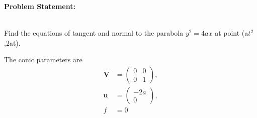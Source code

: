 \documentclass[10pt,a4paper]{report}
\newcommand{\myvec}[1]{\ensuremath{\begin{pmatrix}#1\end{pmatrix}}}
\let\vec\mathbf
\let\vec\mathbf
\begin{document}
\begin{multicols}{2}

\raggedright \textbf{Problem Statement:}\vspace{2mm}
\raggedright \\
\fi
	Find the equations of tangent and normal to the parabola  $y^2 = 4ax$ at point (a$t^2$,2at).
	\\
	\solution
	\iffalse
\vspace{5mm}

\raggedright \textbf{SOLUTION}:\vspace{2mm}\\

\raggedright \textbf{Given}:\vspace{2mm}\\
The given equation of parabola $y^2 = 4ax$ can be written as
\begin{align}
    \label{12/6/3/22eq:conic_quad_form}
    \vec{x}^{\top}\vec{V}\vec{x}+2\vec{u}^{\top}\vec{x}+f=0
    \end{align}
where
\fi
The conic parameters are
\begin{align}
	\label{12/6/3/22eq:V_matrix}
	\vec{V} &= \myvec{0 & 0\\0 & 1},
	\\
	\label{12/6/3/22eq:u_vector}
	\vec{u} &= \myvec{-2a\\0},
	\\
	\label{12/6/3/22eq:f_value}
	f &= 0
\end{align}

\iffalse


\end{multicols}
\end{document}
